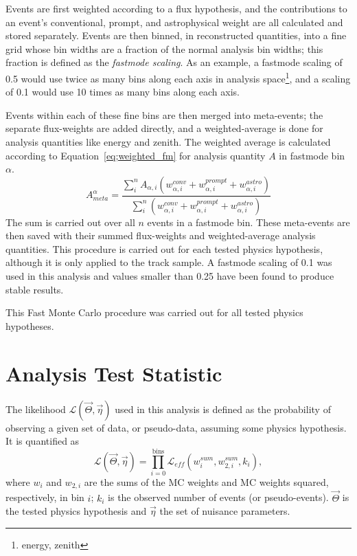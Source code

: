 \documentclass[main.tex]{subfiles}
\begin{document}
Events are first weighted according to a flux hypothesis, and the contributions to an event's conventional, prompt, and astrophysical weight are all calculated and stored separately. 
Events are then binned, in reconstructed quantities, into a fine grid whose bin widths are a fraction of the normal analysis bin widths; this fraction is defined as the \textit{fastmode scaling}.
As an example, a fastmode scaling of 0.5 would use twice as many bins along each axis in analysis space\footnote{energy, zenith}, and a scaling of 0.1 would use 10 times as many bins along each axis. 

Events within each of these fine bins are then merged into meta-events; the separate flux-weights are added directly, and a weighted-average is done for analysis quantities like energy and zenith.
The weighted average is calculated according to Equation~\eqref{eq;weighted_fm} for analysis quantity $A$ in fastmode bin $\alpha$.
\begin{equation}\label{eq;weighted_fm}
A_{meta}^{\alpha} = \dfrac{\sum_{i}^{n} A_{\alpha, i} \left(w_{\alpha, i}^{conv} + w_{\alpha,i}^{prompt} + w_{\alpha,i}^{astro}\right) }{\sum_{i}^{n} \left(w_{\alpha, i}^{conv} + w_{\alpha,i}^{prompt} + w_{\alpha,i}^{astro}\right)}
\end{equation}
The sum is carried out over all $n$ events in a fastmode bin. 
These meta-events are then saved with their summed flux-weights and weighted-average analysis quantities.
This procedure is carried out for each tested physics hypothesis, although it is only applied to the track sample. 
A fastmode scaling of 0.1 was used in this analysis and values smaller than 0.25 have been found to produce stable results. 

This Fast Monte Carlo procedure was carried out for all tested physics hypotheses. 

\section{Analysis Test Statistic}\label{sect:llh_metric}

The likelihood $\mathcal{L}(\vec{\Theta}, \vec{\eta})$ used in this analysis is defined as the probability of observing a given set of data, or pseudo-data, assuming some physics hypothesis.
It is quantified as 
\begin{equation}
    \mathcal{L}(\vec{\Theta}, \vec{\eta}) = \prod_{i=0}^{\text{bins}} \mathcal{L}_{eff}\left( w_{i}^{sum}, w_{2,i}^{sum}, k_{i} \right),
\end{equation}
where $w_{i}$ and $w_{2,i}$ are the sums of the MC weights and MC weights squared, respectively, in bin $i$; $k_{i}$ is the observed number of events (or pseudo-events). 
$\vec{\Theta}$ is the tested physics hypothesis and $\vec{\eta}$ the set of nuisance parameters.
\end{document}
